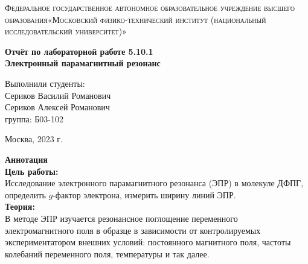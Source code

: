 \documentclass[a4paper, 12pt]{article}%
\begin{document}
	\begin{titlepage}
		\begin{center}
			\textsc{Федеральное государственное автономное образовательное учреждение высшего образования«Московский физико-технический институт (национальный исследовательский университет)»\\[5mm]
			}
			
			\vfill
			
			\textbf{Отчёт по лабораторной работе 5.10.1\\[3mm]
				Электронный парамагнитный резонанс
				\\[50mm]
			}
			
		\end{center}
		
		\hfill
		\begin{minipage}{.5\textwidth}
			Выполнили студенты:\\[2mm]
			Сериков Василий Романович\\[2mm]
			Сериков Алексей Романович\\[2mm]
			группа: Б03-102\\[5mm]
			
		\end{minipage}
		\vfill
		\begin{center}
			Москва, 2023 г.
		\end{center}
		
	\end{titlepage}
	
	\newpage
	\setcounter{page}{2}
	\textbf{Аннотация}\\
	
	\textbf{Цель работы: }\\
	
	 Исследование электронного парамагнитного резонанса (ЭПР) в молекуле ДФПГ, определить $g$-фактор электрона, измерить ширину линий ЭПР.\\
	
	\textbf{Теория: }\\
	
	В методе ЭПР изучается резонансное поглощение переменного электромагнитного поля в
	образце в зависимости от контролируемых экспериментатором внешних условий:
	постоянного магнитного поля, частоты колебаний переменного поля, температуры и так
	далее.
	
\end{document}
